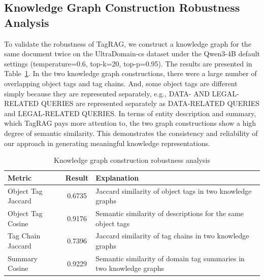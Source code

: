\documentclass[11pt]{article}
\begin{document}
\subsection{Knowledge Graph Construction Robustness Analysis}
To validate the robustness of TagRAG, we construct a knowledge graph for the same document twice on the UltraDomain-cs dataset under the Qwen3-4B default settings (temperature=0.6, top-k=20, top-p=0.95). The results are presented in Table~\ref{tab:kg_construction}.
In the two knowledge graph constructions, there were a large number of overlapping object tags and tag chains. And, some object tags are different simply because they are represented separately, e.g., DATA- AND LEGAL-RELATED QUERIES are represented separately as DATA-RELATED QUERIES and LEGAL-RELATED QUERIES. In terms of entity description and summary, which TagRAG pays more attention to, the two graph constructions show a high degree of semantic similarity. This demonstrates the consistency and reliability of our approach in generating meaningful knowledge representations.

\begin{table}[t]
\centering
\small
\begin{tabular}{lcl}
\toprule
Metric & Result & Explanation \\
\midrule
Object Tag Jaccard & 0.6735 & Jaccard similarity of object tags in two knowledge graphs \\
Object Tag Cosine & 0.9176 & Semantic similarity of descriptions for the same object tags \\
Tag Chain Jaccard & 0.7396 & Jaccard similarity of tag chains in two knowledge graphs \\
Summary Cosine & 0.9229 & Semantic similarity of domain tag summaries in two knowledge graphs \\
\bottomrule
\end{tabular}
\caption{Knowledge graph construction robustness analysis}
\label{tab:kg_construction}
\end{table}








\end{document}
